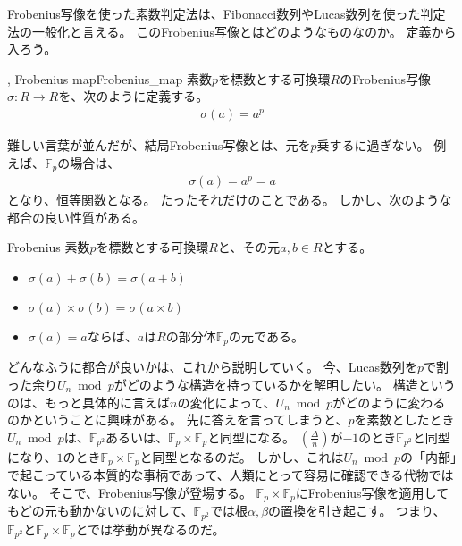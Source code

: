 Frobenius写像を使った素数判定法は、Fibonacci数列やLucas数列を使った判定法の一般化と言える。
このFrobenius写像とはどのようなものなのか。
定義から入ろう。

\begin{Defi}{, Frobenius map}{Frobenius_map}
素数$p$を標数とする可換環$R$のFrobenius写像$\sigma:R\to R$を、次のように定義する。
\begin{align*}
\sigma(a) = a^p
\end{align*}
\end{Defi}

難しい言葉が並んだが、結局Frobenius写像とは、元を$p$乗するに過ぎない。
例えば、$\mathbb{F}_p$の場合は、
\begin{align*}
\sigma(a) = a^p = a
\end{align*}
となり、恒等関数となる。
たったそれだけのことである。
しかし、次のような都合の良い性質がある。

\begin{Prop}{}{Frobenius}
素数$p$を標数とする可換環$R$と、その元$a,b\in R$とする。
\begin{itemize}
\item $\sigma(a) + \sigma(b) = \sigma(a + b)$
\item $\sigma(a) \times \sigma(b) = \sigma(a \times b)$
\item $\sigma(a) = a$ならば、$a$は$R$の部分体$\mathbb{F}_p$の元である。
\end{itemize}
\end{Prop}

どんなふうに都合が良いかは、これから説明していく。
今、Lucas数列を$p$で割った余り$U_n \bmod{p}$がどのような構造を持っているかを解明したい。
構造というのは、もっと具体的に言えば$n$の変化によって、$U_n \bmod{p}$がどのように変わるのかということに興味がある。
先に答えを言ってしまうと、$p$を素数としたとき$U_n \bmod{p}$は、$\mathbb{F}_{p^2}$あるいは、$\mathbb{F}_p\times\mathbb{F}_p$と同型になる。
$\left(\frac{\Delta}{n}\right)$が$-1$のとき$\mathbb{F}_{p^2}$と同型になり、$1$のとき$\mathbb{F}_p\times\mathbb{F}_p$と同型となるのだ。
しかし、これは$U_n \bmod{p}$の「内部」で起こっている本質的な事柄であって、人類にとって容易に確認できる代物ではない。
そこで、Frobenius写像が登場する。
$\mathbb{F}_p\times\mathbb{F}_p$にFrobenius写像を適用してもどの元も動かないのに対して、$\mathbb{F}_{p^2}$では根$\alpha,\beta$の置換を引き起こす。
つまり、$\mathbb{F}_{p^2}$と$\mathbb{F}_p\times\mathbb{F}_p$とでは挙動が異なるのだ。

